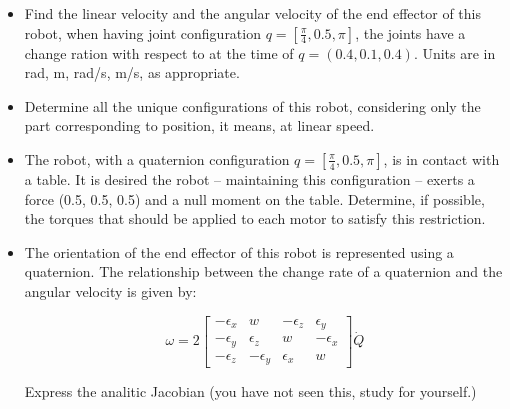 \documentclass[letterpaper,pdftex]{article}
\begin{document}
\begin{itemize}
\item Find the linear velocity and the angular velocity of the end effector of this robot, when having joint configuration $q=[\frac{\pi}{4}, 0.5, \pi]$, the joints have a change ration with respect to at the time of $q = (0.4, 0.1, 0.4)$. Units are in rad, m, rad/s, m/s, as appropriate.
\item Determine all the unique configurations of this robot, considering only the
part corresponding to position, it means, at linear speed.
\item The robot, with a quaternion configuration $q=[\frac{\pi}{4}, 0.5, \pi]$, is in contact with a table. It is desired the robot \--- maintaining this configuration \--- exerts a force (0.5, 0.5, 0.5) and a null moment on the table. Determine, if possible, the torques that should be applied to each motor to satisfy this restriction.
\item The orientation of the end effector of this robot is represented using a quaternion. The relationship between the change rate of a quaternion and the angular velocity is given by:

\begin{equation}
\omega=2\left[\begin{array}{cccc}
-\epsilon_{x} & w & -\epsilon_{z} & \epsilon_{y}\\
-\epsilon_{y} & \epsilon_{z} & w & -\epsilon_{x}\\
-\epsilon_{z} & -\epsilon_{y} & \epsilon_{x} & w
\end{array}\right]\dot{Q}
\end{equation}

Express the analitic Jacobian (you have not seen this, study for yourself.)



\end{itemize}




\end{document}
